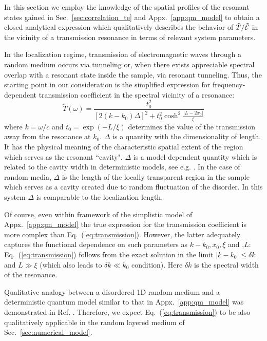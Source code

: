 In this section we employ the knowledge of the spatial profiles of the resonant states gained in Sec.~\ref{sec:correlation_te} and Appx.~\ref{app:qm_model} to obtain a closed analytical expression which qualitatively describes the behavior of $\tilde{T}/\tilde{\cal E}$ in the vicinity of a transmission resonance in terms of relevant system parameters.

In the localization regime, transmission of electromagnetic waves through a random medium occurs via tunneling or, when there exists appreciable spectral overlap with a resonant state inside the sample, via resonant tunneling. Thus, the starting point in our consideration is the simplified expression for frequency-dependent transmission coefficient in the spectral vicinity of a resonance:
\begin{equation}
\tilde{T}(\omega) = \frac{t_0^2}{\left[2(k-k_0)\Delta\right]^2+t_0^2\cosh^2\displaystyle\frac{\left|L-2x_0\right|}{\xi} }
\label{eq:transmission}
\end{equation}
where $k=\omega/c$ and $t_0=\exp(-L/\xi)$ determines the value of the transmission away from the resonance at $k_0$. $\Delta$ is a quantity with the dimensionality of length. It has the physical meaning of the characteristic spatial extent of the region which serves as the resonant ``cavity"\cite{2008_Bliokh}. $\Delta$ is a model dependent quantity which is related to the cavity width in deterministic models, see e.g. \cite{1994_Pendry,2001_Deych_mqw}. In the case of random media, $\Delta$ is the length of the locally transparent region in the sample which serves as a cavity created due to random fluctuation of the disorder. In this system $\Delta$ is comparable to the localization length\cite{2004_Bliokh_wavelet}.

Of course, even within framework of the simplistic model of Appx.~\ref{app:qm_model} the true expression for the transmission coefficient is more complex than Eq.~(\ref{eq:transmission}). However, the latter adequately captures the functional dependence on such parameters as $k-k_0,x_0,\xi$ and ,$L$: Eq.~(\ref{eq:transmission}) follows from the exact solution in the limit $\left|k-k_0\right|\leq\delta k$ and $L\gg\xi$ (which also leads to $\delta k\ll k_0$ condition). Here $\delta k$ is the spectral width of the resonance.

Qualitative analogy between a disordered 1D random medium and a deterministic quantum model similar to that in Appx.~\ref{app:qm_model} was demonstrated in Ref. \cite{2004_Bliokh_wavelet}. Therefore, we expect Eq.~(\ref{eq:transmission}) to be also qualitatively applicable in the random layered medium of Sec.~\ref{sec:numerical_model}.

